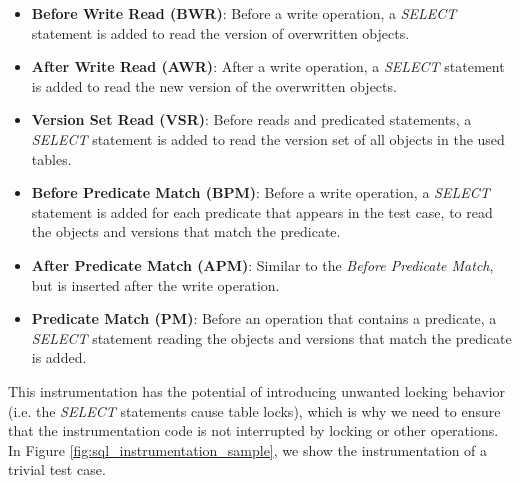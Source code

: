 \begin{itemize}
    \item \textbf{Before Write Read (BWR)}: Before a write operation, a \textit{SELECT} statement is added to read the version of overwritten objects.
    \item \textbf{After Write Read (AWR)}: After a write operation, a \textit{SELECT} statement is added to read the new version of the overwritten objects.
    \item \textbf{Version Set Read (VSR)}: Before reads and predicated statements, a \textit{SELECT} statement is added to read the version set of all objects in the used tables.
    \item \textbf{Before Predicate Match (BPM)}: Before a write operation, a \textit{SELECT} statement is added for each predicate that appears in the test case, to read the objects and versions that match the predicate.
    \item \textbf{After Predicate Match (APM)}: Similar to the \textit{Before Predicate Match}, but is inserted after the write operation.
    \item \textbf{Predicate Match (PM)}: Before an operation that contains a predicate, a \textit{SELECT} statement reading the objects and versions that match the predicate is added.
\end{itemize}

This instrumentation has the potential of introducing unwanted locking behavior (i.e. the \textit{SELECT} statements cause table locks), which is why we need to ensure that the instrumentation code is not interrupted by locking or other operations. In Figure \ref{fig:sql_instrumentation_sample}, we show the instrumentation of a trivial test case.

